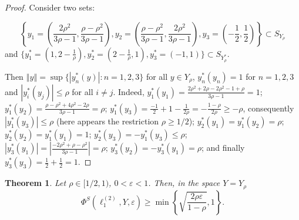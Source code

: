 \documentclass[11pt,a4paper]{amsart}
\newcommand{\eps}{\varepsilon}
\newcommand{\norm}[1]{\left\Vert#1\right\Vert}
\numberwithin{equation}{section}
\theoremstyle{plain}
\newtheorem{theorem}{Theorem}[section]
\theoremstyle{definition}
\renewcommand{\leq}{\leqslant}
\renewcommand{\geq}{\geqslant}
\begin{document}
\begin{proof} 
Consider two sets: 

$$\left\{y_1 = \left(\frac{2\rho^2}{3\rho-1}, \frac{\rho-\rho^2}{3\rho-1}\right), y_2 = \left(\frac{\rho-\rho^2}{3\rho-1}, \frac{2\rho^2}{3\rho-1}\right), y_3 = \left(-\frac{1}{2}, \frac{1}{2}\right)\right\}\subset S_{Y_\rho}$$
and  $\{y_1^* = (1, 2-\frac{1}{\rho}), y_2^* = ( 2-\frac{1}{\rho}, 1), y_3^* = (-1, 1)\}\subset S_{Y_\rho^*}$.

Then   $\norm{y} = \sup\{|y_n^*(y)|: n=1,2,3\}$ for all $y\in Y_\rho$, $y^*_n(y_n) = 1$ for $n=1,2,3$ and
$|y^*_i(y_j)|\leq \rho$ for all $i \neq j$. Indeed,
$y^*_1(y_1) = \frac{2\rho^2+2\rho-2\rho^2-1+\rho}{3\rho-1}=1$; \quad
$y^*_1(y_2) = \frac{\rho-\rho^2+4\rho^2-2\rho}{3\rho-1}=\rho$; \quad
$y^*_1(y_3) = \frac{-1}{2}+1-\frac{1}{2\rho}=-\frac{1-\rho}{2\rho}\geq-\rho $, consequently $|y^*_1(y_3)| \leq \rho $ (here appears the restriction $\rho\geq1/2$); \quad
$y^*_2(y_1) = y^*_1(y_2)= \rho$; \quad
$y^*_2(y_2) = y^*_1(y_1)=1$; \quad
$y^*_2(y_3) = - y^*_1(y_3)\leq \rho$; \\
$|y^*_3(y_1)| = \left|\frac{-2\rho^2+\rho-\rho^2}{3\rho-1}\right|= \rho$; 
$y^*_3(y_2) = -y^*_3(y_1)=\rho$; and finally
$y^*_3(y_3) = \frac{1}{2}+\frac{1}{2}=1$.
\end{proof}

\begin{theorem}\label{th-hexagon}
 Let $ \rho \in [1/2, 1)$, $0<\eps< 1$. Then, in the space $Y = Y_\rho$ 
$$
\Phi^S(\ell_1^{(2)},Y,\varepsilon)\geq \min \left\lbrace\sqrt{\frac{2\rho\eps}{1-\rho}}, 1\right\rbrace.
$$
\end{theorem}
\end{document}
